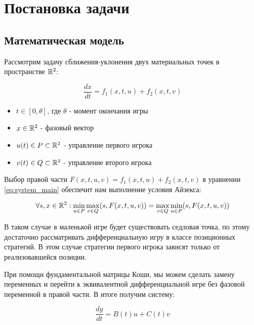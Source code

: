 \chapter{Постановка задачи}

\section{Математическая модель}

Рассмотрим задачу сближения-уклонения двух материальных точек
в пространстве $\mathbb{R}^2$: 

\begin{equation}
    \label{eq:system_main}
    \frac{dx}{dt} = f_1(x,t,u) + f_2(x,t,v)
\end{equation}
 
\begin{itemize}
    \item $t \in [0,\theta]$, где $\theta$ - момент окончания игры
    \item $x \in \mathbb{R}^2$ - фазовый вектор
    \item $u(t) \in P \subset \mathbb{R}^2$ - управление первого игрока
    \item $v(t) \in Q \subset \mathbb{R}^2$ - управление второго игрока
\end{itemize} 

Выбор правой части $F(x,t,u,v) = f_1(x,t,u) + f_2(x,t,v)$
в уравнении \ref{eq:system_main} обеспечит нам выполнение условия Айзекса:

\begin{equation}
    \label{eq:isaacs}
    \forall s, x \in \mathbb{R}^2 :
    \min \limits_{u \in P} \max \limits_{v \in Q}
    (s, F(x,t,u,v)) =
    \max \limits_{v \in Q} \min \limits_{u \in P}
    (s, F(x,t,u,v)) 
\end{equation}
 
В таком случае в маленькой игре будет существовать седловая точка,
по этому достаточно рассматривать дифференциальную игру
в классе позиционных стратегий.
В этом случае стратегии первого игрока зависят
только от реализовавшейся позиции.

При помощи фундаментальной матрицы Коши,
мы можем сделать замену переменных
и перейти к эквивалентной дифференциальной игре
без фазовой переменной в правой части.
В итоге получим систему:

\begin{equation}
    \label{eq:system_plain}
    \frac{dy}{dt} = B(t)u + C(t)v
\end{equation}

